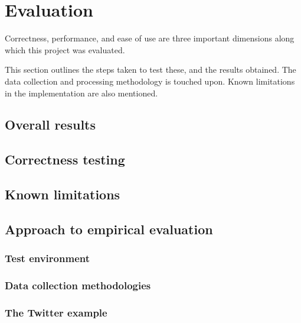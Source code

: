\chapter{Evaluation}\label{ch:eval}

Correctness, performance, and ease of use are three important dimensions along which this project was evaluated.

This section outlines the steps taken to test these, and the results obtained.
The data collection and processing methodology is touched upon.
Known limitations in the implementation are also mentioned.


\section{Overall results}\label{sec:eval:overall}



\section{Correctness testing}\label{sec:eval:correctness}

\section{Known limitations}\label{sec:eval:limitations}


\section{Approach to empirical evaluation}\label{sec:eval:approach}

\subsection{Test environment}\label{sec:eval:approach:environment}

\subsection{Data collection methodologies}\label{sec:eval:approach:collection}

\subsection{The Twitter example}\label{sec:eval:approach:twitter}

